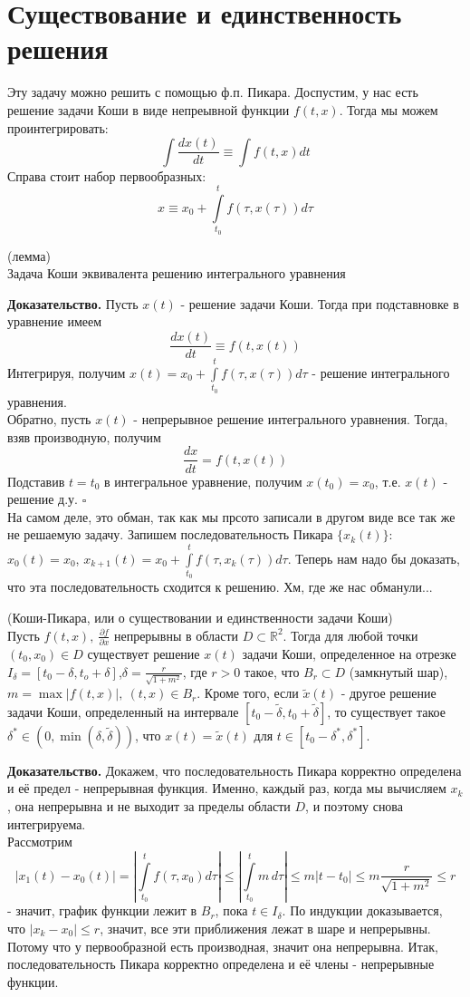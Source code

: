 \section{Существование и единственность решения}
Эту задачу можно решить с помощью ф.п. Пикара. Доспустим, у нас есть 
решение задачи Коши в виде непреывной функции $f(t,x)$. Тогда мы можем
проинтегрировать:
 $$\int \frac{dx(t)}{dt} \equiv \int f(t,x)dt$$ 
 Справа стоит набор первообразных:
 $$x\equiv x_0+\int\limits_{t_0}^{t}f(\tau,x(\tau))d\tau$$ 
\begin{theor} (лемма)\\
    Задача Коши эквивалента решению интегрального уравнения
\end{theor}
\textbf{Доказательство.} Пусть $x(t)$ - решение задачи Коши. Тогда
при подставновке в уравнение имеем 
$$\frac{dx(t)}{dt}\equiv f(t,x(t))$$ 
Интегрируя, получим 
$x(t)=x_0+\int\limits_{t_0}^{t}f(\tau,x(\tau))d\tau$ - решение интегрального
уравнения.\\
Обратно, пусть $x(t)$ - непрерывное решение интегрального уравнения.
Тогда, взяв производную, получим
$$\frac{dx}{dt}=f(t,x(t))$$ 
Подставив $t=t_0$ в интегральное уравнение, получим  $x(t_0)=x_0$, т.е.
$x(t)$ - решение д.у. $\square$ \\
На самом деле, это обман, так как мы прсото записали в другом виде все так 
же не решаемую задачу. Запишем последовательность Пикара $\{x_k(t)\}$:
$x_0(t)=x_0$,  $x_{k+1}(t)=x_0+\int\limits_{t_0}^{t}f(\tau,x_k(\tau))d\tau$.
Теперь нам надо бы доказать, что эта последовательность сходится к 
решению. Хм, где же нас обманули... 
\begin{theor} (Коши-Пикара, или о существовании и единственности задачи 
Коши)\\
Пусть $f(t,x),~\frac{\partial f}{\partial x}$ непрерывны в области $D\subset 
\mathbb{R}^2$. Тогда для любой точки $(t_0,x_0)\in D$ существует решение
$x(t)$ задачи Коши, определенное на отрезке $I_\delta=[t_0-\delta,t_o+\delta]$,$\delta=\frac{r}{\sqrt{1+m^2}}$, где $r>0$ такое, что  $B_r\subset D$
(замкнутый шар), $m=\max|f(t,x)|,~(t,x)\in B_r$. Кроме того, если
$\tilde x(t)$ - другое решение задачи Коши, определенный на интервале
$[t_0-\tilde\delta,t_0+\tilde\delta]$, то существует такое
$\delta^*\in (0,\min(\delta,\tilde\delta))$, что $x(t)=\tilde x(t)$ 
для $t\in [t_0-\delta^*,\delta^*]$.
\end{theor}
\textbf{Доказательство.}  Докажем, что последовательность Пикара корректно
определена и её предел - непрерывная функция. Именно, каждый раз, когда
мы вычисляем $x_k$, она непрерывна и не выходит за пределы области  $D$,
и поэтому снова интегрируема. \\
Рассмотрим $$|x_1(t)-x_0(t)|=
\left| \int\limits_{t_0}^{t}f(\tau,x_0)d\tau\right|\leqslant 
\left|\int\limits_{t_0}^{t}m\,d\tau\right|\leqslant m|t-t_0|\leqslant
m\frac{r}{\sqrt{1+m^2}}\leqslant r$$ - значит, график функции лежит в 
$B_r$, пока  $t\in I_\delta$. По индукции доказывается, что 
$|x_k-x_0|\leqslant r$, значит, все эти приближения лежат в шаре и непрерывны.
Потому что у первообразной есть производная, значит она непрерывна. 
Итак, последовательность Пикара корректно определена и её члены - непрерывные 
функции.

